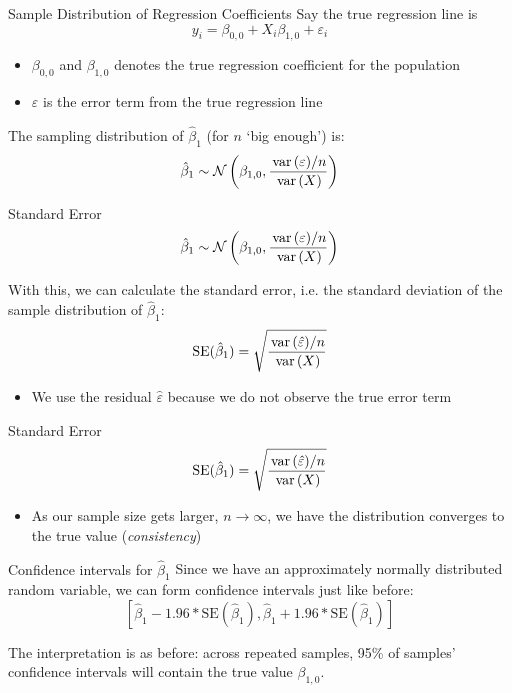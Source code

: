 \documentclass[aspectratio=169,t,11pt,table]{beamer}
\begin{document}
\begin{frame}{Sample Distribution of Regression Coefficients}
  Say the true regression line is 
  $$
      y_i = \beta_{0,0} + X_i \beta_{1,0} + \varepsilon_i
  $$
  \begin{itemize}
    \item $\beta_{0,0}$ and $\beta_{1,0}$ denotes the true regression coefficient for the population
    
    \item $\varepsilon$ is the error term from the true regression line 
  \end{itemize}

  \pause
  \bigskip
  The sampling distribution of $\hat{\beta}_1$ (for $n$ `big enough') is:
  $$
    \hat{\beta}_1 \sim 
    \mathcal{N}\left( 
      \beta_{1, 0}, \frac{ \var{\varepsilon} / n }{\var{X}} 
    \right)
  $$
\end{frame}

\begin{frame}{Standard Error}
  $$
    \hat{\beta}_1 \sim 
    \mathcal{N}\left( 
      \beta_{1, 0}, \frac{ \var{\varepsilon} / n }{\var{X}} 
    \right)
  $$

  \bigskip
  With this, we can calculate the \alert{standard error}, i.e. the standard deviation of the sample distribution of $\hat{\beta}_1$:
  $$
    \text{SE}(\hat{\beta}_1) = \sqrt{ \frac{ \var{\hat{\varepsilon}} / n }{\var{X}} }
  $$
  \begin{itemize}
    \item We use the residual $\hat{\varepsilon}$ because we do not observe the true error term
  \end{itemize}
\end{frame}

\begin{frame}{Standard Error}
  $$
    \text{SE}(\hat{\beta}_1) = \sqrt{ \frac{ \var{\hat{\varepsilon}} / n }{\var{X}} }
  $$

  \begin{itemize}
    \item As our sample size gets larger, $n \to \infty$, we have the distribution converges to the true value (\emph{consistency})
  \end{itemize}
\end{frame}


\begin{frame}{Confidence intervals for $\hat{\beta}_1$}
  Since we have an approximately normally distributed random variable, we can form confidence intervals just like before:
  $$
    \left[
      \hat{\beta}_1 - 1.96 * \text{SE}(\hat{\beta}_1), 
      \hat{\beta}_1 + 1.96 * \text{SE}(\hat{\beta}_1)
    \right]
  $$

  \pause
  \bigskip
  The interpretation is as before: across repeated samples, 95\% of samples' confidence intervals will contain the true value $\beta_{1, 0}$.
\end{frame}
\end{document}
